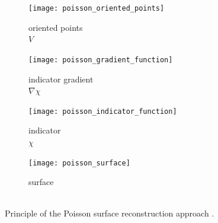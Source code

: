 \begin{description}
	\begin{figure}
		\centering
		\begin{subfigure}[b]{0.24\textwidth}
			\centering
			\texttt{[image: poisson\_oriented\_points]}
			\captionsetup{justification=centering}
			\caption{
				oriented points\\
				$V$
			}
			\label{fig:poisson_oriented_points}
		\end{subfigure}
		\begin{subfigure}[b]{0.24\textwidth}
			\centering
			\texttt{[image: poisson\_gradient\_function]}
			\captionsetup{justification=centering}
			\caption{
				indicator gradient\\
				$\nabla\chi$
			}
			\label{fig:poisson_gradient_function}
		\end{subfigure}
		\begin{subfigure}[b]{0.24\textwidth}
			\centering
			\texttt{[image: poisson\_indicator\_function]}
			\captionsetup{justification=centering}
			\caption{
				indicator\\
				$\chi$
			}
			\label{fig:poisson_indicator_function}
		\end{subfigure}
		\begin{subfigure}[b]{0.24\textwidth}
			\centering
			\texttt{[image: poisson\_surface]}
			\captionsetup{justification=centering}
			\caption{
				surface\\
				~
			}
			\label{fig:poisson_surface}
		\end{subfigure}
		\caption{
			Principle of the Poisson surface reconstruction approach \cite{poisson}.
		}
		\label{fig:poisson_principle}
	\end{figure}


\end{description}
